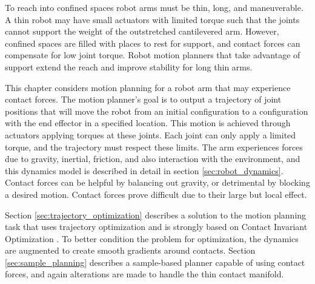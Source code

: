 \documentclass[../thesis.tex]{subfiles}
\begin{document}
To reach into confined spaces robot arms must be thin, long, and maneuverable.
A thin robot may have small actuators with limited torque such that the joints cannot support the weight of the outstretched cantilevered arm.
However, confined spaces are filled with places to rest for support, and contact forces can compensate for low joint torque. 
Robot motion planners that take advantage of support extend the reach and improve stability for long thin arms.

This chapter considers motion planning for a robot arm that may experience contact forces.
The motion planner's goal is to output a trajectory of joint positions that will move the robot from an initial configuration to a configuration with the end effector in a specified location.
This motion is achieved through actuators applying torques at these joints.
Each joint can only apply a limited torque, and the trajectory must respect these limits.
The arm experiences forces due to gravity, inertial, friction, and also interaction with the environment, and this dynamics model is described in detail in section \ref{sec:robot_dynamics}.
Contact forces can be helpful by balancing out gravity, or detrimental by blocking a desired motion.
Contact forces prove difficult due to their large but local effect.


Section \ref{sec:trajectory_optimization} describes a solution to the motion planning task that uses trajectory optimization and is strongly based on Contact Invariant Optimization \cite{Mordatch2012}.
To better condition the problem for optimization, the dynamics are augmented to create smooth gradients around contacts.
Section \ref{sec:sample_planning} describes a sample-based planner capable of using contact forces, and again alterations are made to handle the thin contact manifold.







\end{document}

